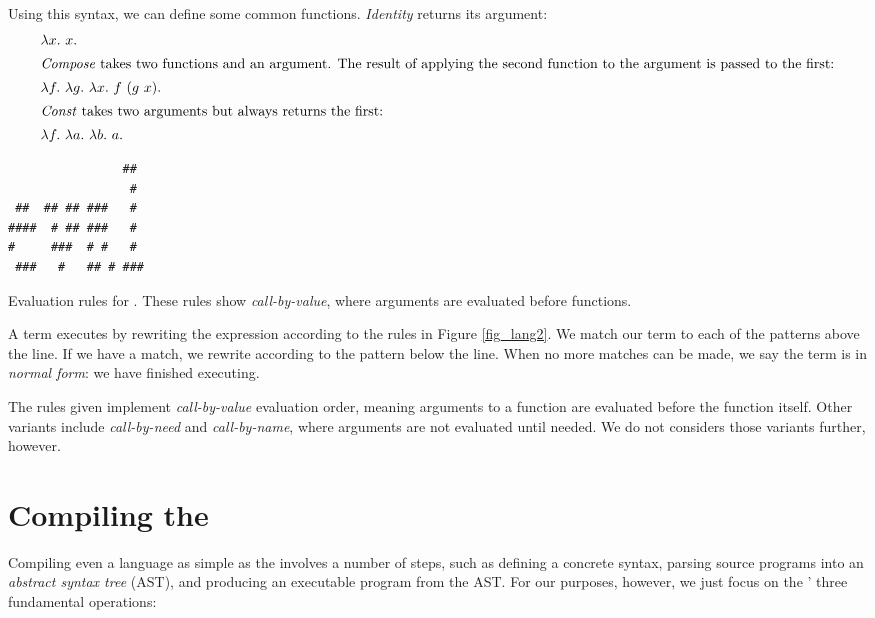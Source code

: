 \documentclass[12pt]{report}
\begin{document}
Using this syntax, we can define some common functions. \emph{Identity} 
returns its argument:
\begin{align}
  & \lambda x.\ x. \\
\intertext{\emph{Compose} takes two functions and an argument. The result of
applying the second function to the argument is passed to the first:}
  & \lambda f.\ \lambda g.\ \lambda x.\ f\ (g\ x). \\
\intertext{\emph{Const} takes two arguments but always returns the first:}
  & \lambda f.\ \lambda a.\ \lambda b.\ a.
\end{align}

\begin{myfig}[bt]
\begin{minipage}{2in}
\begin{Verbatim}
                ##  
                 #  
 ##  ## ## ###   #  
####  # ## ###   #  
#     ###  # #   #  
 ###   #   ## # ### 
\end{Verbatim}
\end{minipage}
  \caption{Evaluation rules for \lamA. These rules show 
    \emph{call-by-value}, where arguments are evaluated
    before functions.}
  \label{fig_lang2}
\end{myfig}

A \lamA term executes by rewriting the expression according to the
rules in Figure \ref{fig_lang2}. We match our term to each of the
patterns above the line. If we have a match, we rewrite according to
the pattern below the line. When no more matches can be made, we say
the term is in \emph{normal form}: we have finished executing.

The rules given implement \emph{call-by-value} evaluation order,
meaning arguments to a function are evaluated before the function
itself. Other variants include \emph{call-by-need} and
\emph{call-by-name}, where arguments are not evaluated until
needed. We do not considers those variants further, however.

\section{Compiling the \LamA}

Compiling even a language as simple as the \lamA involves a number of
steps, such as defining a concrete syntax, parsing source programs
into an \emph{abstract syntax tree} (AST), and producing an executable
program from the AST. For our purposes, however, we just focus on the
\lamA' three fundamental operations:
\end{document}
